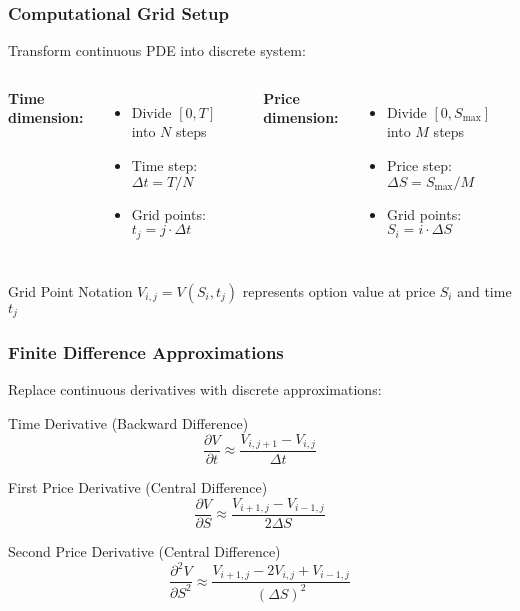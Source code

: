 \documentclass{beamer}
\begin{document}
\begin{frame}
\frametitle{Computational Grid Setup}
Transform continuous PDE into discrete system:

\begin{columns}
\textbf{Time dimension:}
\begin{itemize}
\item Divide $[0, T]$ into $N$ steps
\item Time step: $\Delta t = T/N$
\item Grid points: $t_j = j \cdot \Delta t$
\end{itemize}

\textbf{Price dimension:}
\begin{itemize}
\item Divide $[0, S_{\max}]$ into $M$ steps
\item Price step: $\Delta S = S_{\max}/M$
\item Grid points: $S_i = i \cdot \Delta S$
\end{itemize}

\end{columns}

\begin{block}{Grid Point Notation}
$V_{i,j} = V(S_i, t_j)$ represents option value at price $S_i$ and time $t_j$
\end{block}
\end{frame}

\begin{frame}
\frametitle{Finite Difference Approximations}
Replace continuous derivatives with discrete approximations:

\begin{block}{Time Derivative (Backward Difference)}
$$\frac{\partial V}{\partial t} \approx \frac{V_{i,j+1} - V_{i,j}}{\Delta t}$$
\end{block}

\begin{block}{First Price Derivative (Central Difference)}
$$\frac{\partial V}{\partial S} \approx \frac{V_{i+1,j} - V_{i-1,j}}{2\Delta S}$$
\end{block}

\begin{block}{Second Price Derivative (Central Difference)}
$$\frac{\partial^2 V}{\partial S^2} \approx \frac{V_{i+1,j} - 2V_{i,j} + V_{i-1,j}}{(\Delta S)^2}$$
\end{block}
\end{frame}
\end{document}
